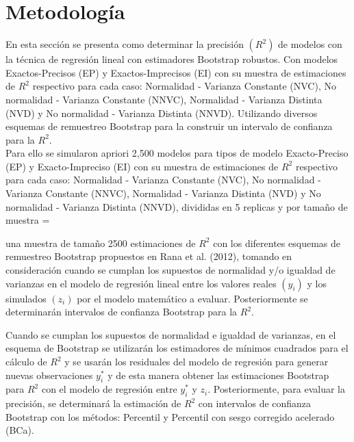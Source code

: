 \section{Metodología}



En esta sección se presenta como determinar la precisión $(R^{2})$ de modelos con la técnica de regresión lineal con estimadores Bootstrap robustos. Con modelos Exactos-Precisos (EP) y Exactos-Imprecisos (EI) con su muestra de estimaciones de $R^{2}$ respectivo para cada caso: Normalidad - Varianza Constante (NVC), No normalidad - Varianza Constante (NNVC), Normalidad - Varianza Distinta (NVD) y No normalidad - Varianza Distinta (NNVD). Utilizando diversos esquemas de remuestreo Bootstrap para la construir un intervalo de confianza para la $R^{2}$.\\


Para ello se simularon apriori 2,500 modelos para tipos de modelo Exacto-Preciso (EP) y Exacto-Impreciso (EI) con su muestra de estimaciones de $R^{2}$ respectivo para cada caso: Normalidad - Varianza Constante (NVC), No normalidad - Varianza Constante (NNVC), Normalidad - Varianza Distinta (NVD) y No normalidad - Varianza Distinta (NNVD), divididas en 5 replicas y por tamaño de muestra  = 







 una muestra de tamaño 2500 estimaciones de $R^{2}$ con los diferentes esquemas de remuestreo Bootstrap propuestos en Rana et al. (2012), tomando en consideración cuando se cumplan los supuestos de normalidad y/o igualdad de varianzas en el modelo de regresión lineal entre los valores reales $( y_{i} )$  y los simulados $( z_{i} )$ por el modelo matemático a evaluar. Posteriormente se determinarán intervalos de confianza Bootstrap para la  $R^{2}$.
\vspace{.5cm}



Cuando se cumplan los supuestos de normalidad e igualdad de varianzas, en el esquema de Bootstrap se utilizarán los estimadores de mínimos cuadrados para el cálculo de $R^{2}$ y se usarán los residuales del modelo de regresión para generar nuevas observaciones $ y_{i}^{*} $ y de esta manera obtener las estimaciones Bootstrap para $R^{2}$  con el modelo de regresión entre $ y_{i}^{*} $  y  $ z_{i} $. Posteriormente, para evaluar la precisión, se determinará la estimación de $R^{2}$ con intervalos de confianza Bootstrap con los métodos: Percentil y Percentil con sesgo corregido acelerado (BCa).
\vspace{.5cm}

